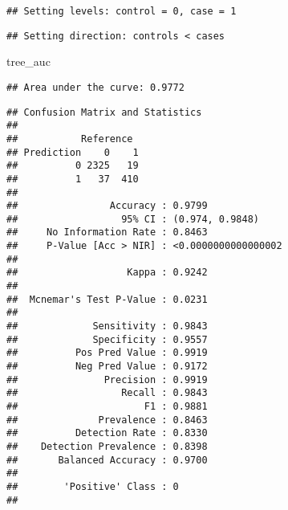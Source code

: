 \documentclass[
]{article}
\newenvironment{Shaded}{\begin{snugshade}}{\end{snugshade}}
\newcommand{\AttributeTok}[1]{\textcolor[rgb]{0.13,0.29,0.53}{#1}}
\newcommand{\CommentTok}[1]{\textcolor[rgb]{0.56,0.35,0.01}{\textit{#1}}}
\newcommand{\FunctionTok}[1]{\textcolor[rgb]{0.13,0.29,0.53}{\textbf{#1}}}
\newcommand{\NormalTok}[1]{#1}
\newcommand{\OtherTok}[1]{\textcolor[rgb]{0.56,0.35,0.01}{#1}}
\newcommand{\SpecialCharTok}[1]{\textcolor[rgb]{0.81,0.36,0.00}{\textbf{#1}}}
\newcommand{\StringTok}[1]{\textcolor[rgb]{0.31,0.60,0.02}{#1}}
\begin{document}
\begin{verbatim}
## Setting levels: control = 0, case = 1
\end{verbatim}

\begin{verbatim}
## Setting direction: controls < cases
\end{verbatim}

\begin{Shaded}
\begin{Highlighting}[]
\NormalTok{tree\_auc}
\end{Highlighting}
\end{Shaded}

\begin{verbatim}
## Area under the curve: 0.9772
\end{verbatim}

\begin{Shaded}
\end{Shaded}

\begin{verbatim}
## Confusion Matrix and Statistics
## 
##           Reference
## Prediction    0    1
##          0 2325   19
##          1   37  410
##                                              
##                Accuracy : 0.9799             
##                  95% CI : (0.974, 0.9848)    
##     No Information Rate : 0.8463             
##     P-Value [Acc > NIR] : <0.0000000000000002
##                                              
##                   Kappa : 0.9242             
##                                              
##  Mcnemar's Test P-Value : 0.0231             
##                                              
##             Sensitivity : 0.9843             
##             Specificity : 0.9557             
##          Pos Pred Value : 0.9919             
##          Neg Pred Value : 0.9172             
##               Precision : 0.9919             
##                  Recall : 0.9843             
##                      F1 : 0.9881             
##              Prevalence : 0.8463             
##          Detection Rate : 0.8330             
##    Detection Prevalence : 0.8398             
##       Balanced Accuracy : 0.9700             
##                                              
##        'Positive' Class : 0                  
## 
\end{verbatim}
\end{document}
